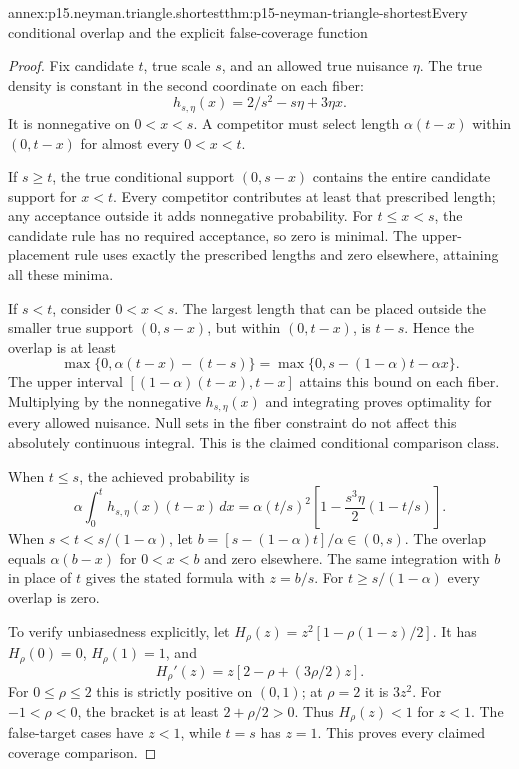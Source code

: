 \begin{annexitem}{annex:p15.neyman.triangle.shortest}{thm:p15-neyman-triangle-shortest}{Every conditional overlap and the explicit false-coverage function}
\begin{proof}
Fix candidate \(t\), true scale \(s\),
and an allowed true nuisance \(\eta\).
The true density is constant in the
second coordinate on each fiber:
\[
                       h_{s,\eta}(x)=2/s^2-s\eta+3\eta x.
\]
It is nonnegative on \(0<x<s\).
A competitor must select length
\(\alpha(t-x)\) within \((0,t-x)\)
for almost every \(0<x<t\).

If \(s\geq t\), the true conditional
support \((0,s-x)\) contains the
entire candidate support for \(x<t\).
Every competitor contributes at least
that prescribed length; any acceptance
outside it adds nonnegative probability.
For \(t\leq x<s\), the candidate rule
has no required acceptance, so zero
is minimal. The upper-placement rule
uses exactly the prescribed lengths
and zero elsewhere, attaining all
these minima.

If \(s<t\), consider \(0<x<s\).
The largest length that can be placed
outside the smaller true support
\((0,s-x)\), but within \((0,t-x)\),
is \(t-s\). Hence the overlap is
at least
\[
                \max\{0,\alpha(t-x)-(t-s)\}
                 =\max\{0,s-(1-\alpha)t-\alpha x\}.
\]
The upper interval
\([(1-\alpha)(t-x),t-x]\)
attains this bound on each fiber.
Multiplying by the nonnegative
\(h_{s,\eta}(x)\) and integrating
proves optimality for every allowed
nuisance. Null sets in the fiber
constraint do not affect this
absolutely continuous integral.
This is the claimed conditional
comparison class.

When \(t\leq s\), the achieved
probability is
\[
        \alpha\int_0^t h_{s,\eta}(x)(t-x)\,dx
        =\alpha(t/s)^2
                    \left[1-\frac{s^3\eta}{2}(1-t/s)\right].
\]
When \(s<t<s/(1-\alpha)\), let
\(b=[s-(1-\alpha)t]/\alpha\in(0,s)\).
The overlap equals \(\alpha(b-x)\)
for \(0<x<b\) and zero elsewhere.
The same integration with \(b\)
in place of \(t\) gives the
stated formula with \(z=b/s\).
For \(t\geq s/(1-\alpha)\) every
overlap is zero.

To verify unbiasedness explicitly,
let \(H_\rho(z)=z^2[1-\rho(1-z)/2]\).
It has \(H_\rho(0)=0\),
\(H_\rho(1)=1\), and
\[
                          H_\rho'(z)=z[2-\rho+(3\rho/2)z].
\]
For \(0\leq\rho\leq2\) this
is strictly positive on \((0,1)\);
at \(\rho=2\) it is \(3z^2\).
For \(-1<\rho<0\), the bracket
is at least \(2+\rho/2>0\).
Thus \(H_\rho(z)<1\) for \(z<1\).
The false-target cases have
\(z<1\), while \(t=s\) has
\(z=1\). This proves every
claimed coverage comparison.
\end{proof}
\end{annexitem}

